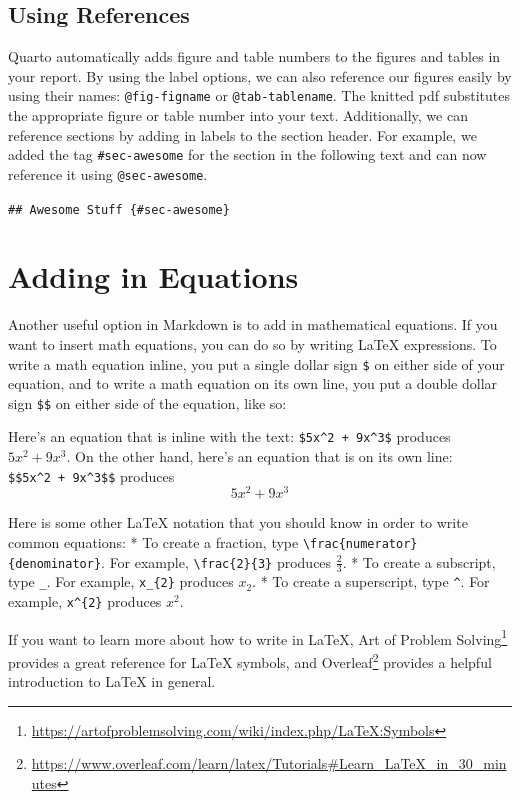 \documentclass[
  letterpaper,
]{latex/krantz}
\renewcommand{\href}[2]{#2\footnote{\url{#1}}}
\begin{document}
\subsection{\texorpdfstring{Using References
}{Using References }}\label{using-references}

Quarto automatically adds figure and table numbers to the figures and
tables in your report. By using the label options, we can also reference
our figures easily by using their names: \texttt{@fig-figname} or
\texttt{@tab-tablename}. The knitted pdf substitutes the appropriate
figure or table number into your text. Additionally, we can reference
sections by adding in labels to the section header. For example, we
added the tag \texttt{\#sec-awesome} for the section in the following
text and can now reference it using \texttt{@sec-awesome}.

\texttt{\#\#\ Awesome\ Stuff\ \{\#sec-awesome\}}

\section{Adding in Equations}\label{adding-in-equations}


Another useful option in Markdown is to add in mathematical equations.
If you want to insert math equations, you can do so by writing LaTeX
expressions. To write a math equation inline, you put a single dollar
sign \texttt{\$} on either side of your equation, and to write a math
equation on its own line, you put a double dollar sign \texttt{\$\$} on
either side of the equation, like so:

Here's an equation that is inline with the text:
\texttt{\$5x\^{}2\ +\ 9x\^{}3\$} produces \(5x^2 + 9x^3\). On the other
hand, here's an equation that is on its own line:
\texttt{\$\$5x\^{}2\ +\ 9x\^{}3\$\$} produces \[5x^2 + 9x^3\]

Here is some other LaTeX notation that you should know in order to write
common equations: * To create a fraction, type
\texttt{\textbackslash{}frac\{numerator\}\{denominator\}}. For example,
\texttt{\textbackslash{}frac\{2\}\{3\}} produces \(\frac{2}{3}\). * To
create a subscript, type \texttt{\_}. For example, \texttt{x\_\{2\}}
produces \(x_2\). * To create a superscript, type \texttt{\^{}}. For
example, \texttt{x\^{}\{2\}} produces \(x^2\).

If you want to learn more about how to write in LaTeX,
\href{https://artofproblemsolving.com/wiki/index.php/LaTeX:Symbols}{Art
of Problem Solving} provides a great reference for LaTeX symbols, and
\href{https://www.overleaf.com/learn/latex/Tutorials\#Learn_LaTeX_in_30_minutes}{Overleaf}
provides a helpful introduction to LaTeX in general.
\end{document}

